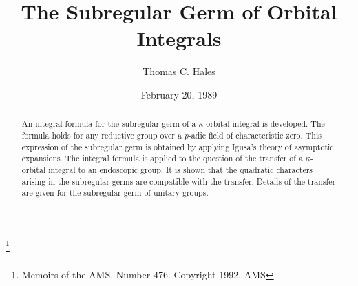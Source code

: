 \documentclass{memo-l}
\theoremstyle{definition}
\theoremstyle{remark}
\numberwithin{section}{chapter}
\numberwithin{equation}{chapter}
\begin{document}
\frontmatter

\title{The Subregular Germ of Orbital Integrals}
\author{Thomas C. Hales}
\address{University of Pittsburgh 15260}
\email{}
\thanks{Memoirs of the AMS, Number 476. Copyright 1992, AMS}
\date{February 20, 1989}


\keywords{}


\maketitle

\tableofcontents

\begin{abstract} 
  An integral formula for the subregular germ of a $\kappa$-orbital
  integral is developed.  The formula holds for any reductive group
  over a $p$-adic field of characteristic zero.  This expression of
  the subregular germ is obtained by applying Igusa's theory of
  asymptotic expansions.  The integral formula is applied to the
  question of the transfer of a $\kappa$-orbital integral to an
  endoscopic group.  It is shown that the quadratic characters arising
  in the subregular germs are compatible with the transfer.  Details
  of the transfer are given for the subregular germ of unitary groups.
\end{abstract}

%

%








\newcommand\AAA{{\Bbb A}}                   \newcommand\BB{{\Bbb B\,}}
\newcommand\CC{{\Bbb C}}                    \newcommand\GG{{\Bbb G}}
\newcommand\PP{{\Bbb P}}                    \newcommand\RR{{\Bbb R}}
\newcommand\TT{{\Bbb T}}                    \newcommand\ZZ{{\Bbb Z}}
\newcommand\bWW{{\Bbb W}}                       \newcommand\bW{\bold{W}}
\end{document}
